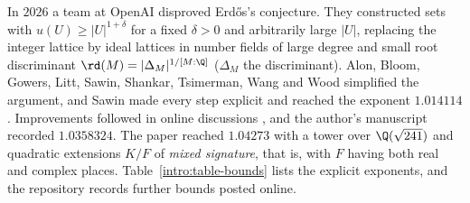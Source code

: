 In $2026$ a team at OpenAI \cite{OpenAI2026} disproved Erd\H{o}s's
conjecture. They constructed sets with $u(U)\ge|U|^{1+\delta}$ for a
fixed $\delta>0$ and arbitrarily large $|U|$, replacing the integer
lattice by ideal lattices in number fields of large degree and small
root discriminant $\rd(M)=|\Delta_M|^{1/[M:\Q]}$ ($\Delta_M$ the
discriminant). Alon, Bloom, Gowers, Litt, Sawin, Shankar, Tsimerman,
Wang and Wood \cite{Alon2026} simplified the argument, and Sawin
\cite{Sawin2026} made every step explicit and reached the exponent
$1.014114$. Improvements followed in online discussions
\cite{ErdosProblems90,SpiderduckpigMO2026,NaslundMO2026}, and the
author's manuscript \cite{Naslund0358} recorded $1.0358324$. The paper
\cite{Naslund04273} reached $1.04273$ with a tower over
$\Q(\sqrt{241})$ and quadratic extensions $K/F$ of \emph{mixed
signature}, that is, with $F$ having both real and complex places.
Table~\ref{intro:table-bounds} lists the explicit exponents, and the
repository \cite{TaoConstants84a} records further bounds posted online.

